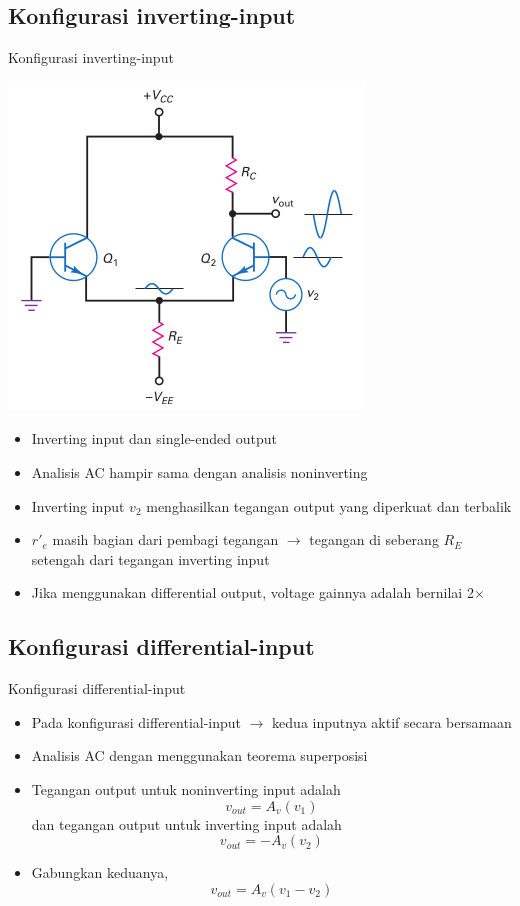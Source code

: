 \documentclass[aspectratio=169]{beamer}
\begin{document}
\subsection{Konfigurasi inverting-input}
\begin{frame}{Konfigurasi inverting-input}
	\begin{multicols}{2}
		\begin{center}
			\includegraphics[height=0.7\textheight]{gambar/01.inverting_input_+single-ended_output}
		\end{center}
		\columnbreak
		\begin{itemize}
			\item Inverting input dan single-ended output
			\item Analisis AC hampir sama dengan analisis noninverting
			\item Inverting input $ v_2 $ menghasilkan tegangan output yang diperkuat dan terbalik
			\item $ r'_e $ masih bagian dari pembagi tegangan $ \rightarrow $ tegangan di seberang $ R_E $ setengah dari tegangan inverting input
			\item Jika menggunakan differential output, voltage gainnya adalah bernilai 2$\times$
		\end{itemize}
		\vfill\null
	\end{multicols}
\end{frame}

\subsection{Konfigurasi differential-input}
\begin{frame}{Konfigurasi differential-input}
	\begin{itemize}
		\item Pada konfigurasi differential-input $ \rightarrow $ kedua inputnya aktif secara bersamaan
		\item Analisis AC dengan menggunakan teorema superposisi
		\item Tegangan output untuk noninverting input adalah $$ v_{out} = A_v(v_1) $$ dan tegangan output untuk inverting input adalah $$ v_{out} = -A_v (v_2) $$
		\item Gabungkan keduanya, $$ v_{out} = A_v (v_1 - v_2) $$
	\end{itemize}
\end{frame}
\end{document}
